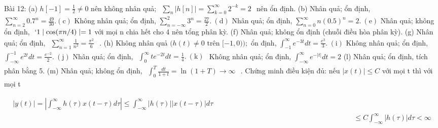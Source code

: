 \documentclass[
  10
]{article}
\begin{document}
Bài 12: (a) \(h [ - 1 ] = { \textstyle { \frac { 1 } { 2 } } } \neq 0\)
nên không nhân quả;
\(\begin{array} { r } { \sum _ { n } | h [ n ] | = \sum _ { k = 0 } ^ { \infty } 2 ^ { - k } = 2 } \end{array}\)
nên ổn định. (b) Nhân quả; ổn định,
\(\textstyle \sum _ { n = 2 } ^ { \infty } 0 . 7 ^ { n } = { \frac { 4 9 } { 3 0 } } . { \mathrm { ( c ) } }\)
Không nhân quả; ổn định,
\(\textstyle \sum _ { n = - \infty } ^ { 2 } 3 ^ { n } = { \frac { 2 7 } { 2 } } . \ ( \mathrm { d } )\)
Nhân quả; ổn định,
\(\textstyle \sum _ { n = 0 } ^ { \infty } n ( 0 . 5 ) ^ { n } = 2 . { \mathrm { ~ ( e ) } }\)
Nhân quả; không ổn định, \(\ ` 1 \mid \cos ( \pi n / 4 ) \mid = 1\) với
mọi n chia hết cho 4 nên tổng phân kỳ. (f) Nhân quả; không ổn định
(chuỗi điều hòa phân kỳ). (g) Nhân quả; ổn định,
\(\begin{array} { r } { \sum _ { n = 1 } ^ { \infty } \frac { 1 } { n ^ { 2 } } = \frac { \pi ^ { 2 } } { 6 } } \end{array}\)
. (h) Không nhân quả \(( h ( t ) \neq 0\) trên \([ - 1 , 0 ) ) ;\) ổn
định,
\(\textstyle \int _ { - 1 } ^ { \infty } e ^ { - 3 t } d t = { \frac { e ^ { 3 } } { 3 } } . { \mathrm { ~ ( i ) } }\)
Không nhân quả; ổn định,
\(\textstyle \int _ { - \infty } ^ { - 1 } e ^ { 2 t } d t = { \frac { e ^ { - 2 } } { 2 } } . \ ( { \mathrm { j } } )\)
Nhân quả; ổn định,
\(\begin{array} { r } { \int _ { 0 } ^ { \infty } t e ^ { - 2 t } d t = \frac { 1 } { 4 } . \ ( \mathrm { k } ) } \end{array}\)
Không nhân quả; ổn định,
\(\textstyle \int _ { - \infty } ^ { \infty } e ^ { - | t | } d t = 2\)
(l) Nhân quả; ổn định, tích phân bằng 5. (m) Nhân quả; không ổn định,
\(\begin{array} { r } { \int _ { 0 } ^ { T } \frac { d t } { 1 + t } = \ln ( 1 + T ) \to \infty } \end{array}\)
. Chứng minh điều kiện đủ: nếu \(| x ( t ) | \leq C\) với mọi t thì với
mọi t

\[
\begin{array}{c} | y (t) | = \left| \int_ {- \infty} ^ {\infty} h (\tau) x (t - \tau) d \tau \right| \leq \int_ {- \infty} ^ {\infty} | h (\tau) | | x (t - \tau) | d \tau \\ \qquad \qquad \qquad \qquad \qquad \qquad \qquad \qquad \qquad \qquad \qquad \qquad \qquad \qquad \qquad \qquad \qquad \qquad \qquad \qquad \qquad \qquad \qquad \qquad \leq C \int_ {- \infty} ^ {\infty} | h (\tau) | d \tau <   \infty \end{array}
\]
\end{document}
